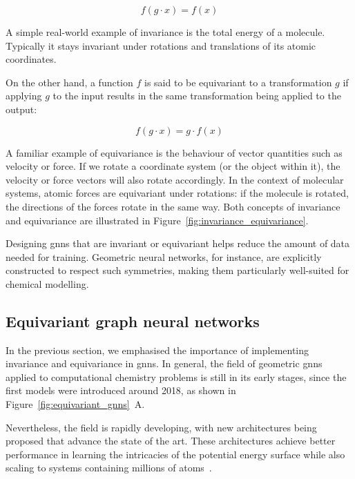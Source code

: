 \begin{equation}
f(g \cdot x) = f(x)
\label{eq:invariance}
\end{equation}

A simple real-world example of invariance is the total energy of a molecule. Typically it stays invariant under rotations and translations of its atomic coordinates.

On the other hand, a function $f$ is said to be equivariant to a transformation $g$ if applying $g$ to the input results in the same transformation being applied to the output:

\begin{equation}
f(g \cdot x) = g \cdot f(x)
\label{eq:equivariance}
\end{equation}

A familiar example of equivariance is the behaviour of vector quantities such as velocity or force. If we rotate a coordinate system (or the object within it), the velocity or force vectors will also rotate accordingly. In the context of molecular systems, atomic forces are equivariant under rotations: if the molecule is rotated, the directions of the forces rotate in the same way. Both concepts of invariance and equivariance are illustrated in Figure~\ref{fig:invariance_equivariance}.

Designing \acp{gnn} that are invariant or equivariant helps reduce the amount of data needed for training. Geometric neural networks, for instance, are explicitly constructed to respect such symmetries, making them particularly well-suited for chemical modelling.



\subsection{Equivariant graph neural networks}
In the previous section, we emphasised the importance of implementing invariance and equivariance in \acp{gnn}. In general, the field of geometric \acp{gnn} applied to computational chemistry problems is still in its early stages, since the first models were introduced around 2018, as shown in Figure~\ref{fig:equivariant_gnns}~A.

Nevertheless, the field is rapidly developing, with new architectures being proposed that advance the state of the art. These architectures achieve better performance in learning the intricacies of the potential energy surface while also scaling to systems containing millions of atoms~\citep{musaelianLearningLocalEquivariant2023}.

